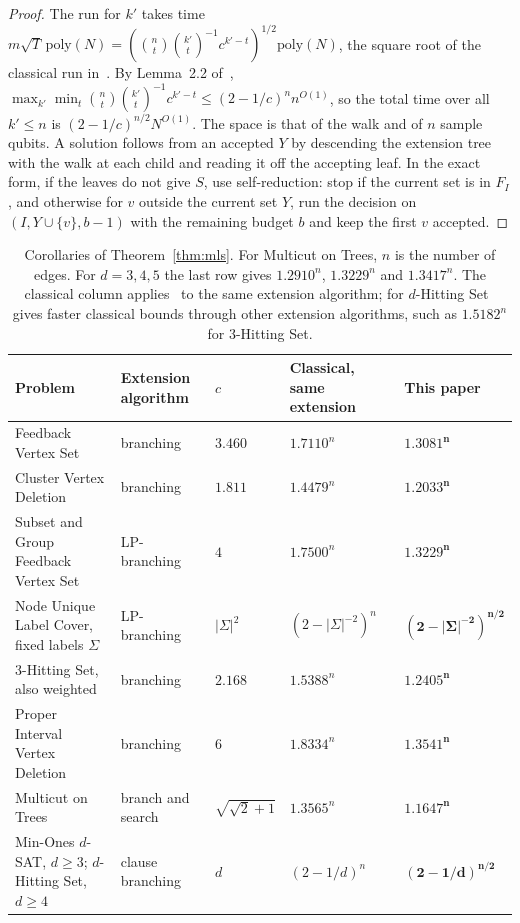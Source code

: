 \documentclass[11pt]{article}
\theoremstyle{remark}
\newcommand{\poly}{\mathrm{poly}}
\begin{document}
\begin{proof}
The run for $k'$ takes time $m\sqrt{T}\,\poly(N) = (\binom{n}{t}\binom{k'}{t}^{-1} c^{k'-t})^{1/2}\poly(N)$, the square root of the classical run in~\cite{FGLS19}. By Lemma~2.2 of~\cite{FGLS19}, $\max_{k'}\min_t \binom{n}{t}\binom{k'}{t}^{-1}c^{k'-t} \le (2-1/c)^n n^{O(1)}$, so the total time over all $k' \le n$ is $(2-1/c)^{n/2}N^{O(1)}$. The space is that of the walk and of $n$ sample qubits. A solution follows from an accepted $Y$ by descending the extension tree with the walk at each child and reading it off the accepting leaf. In the exact form, if the leaves do not give $S$, use self-reduction: stop if the current set is in $F_I$, and otherwise for $v$ outside the current set $Y$, run the decision on $(I, Y \cup \{v\}, b - 1)$ with the remaining budget $b$ and keep the first $v$ accepted.
\end{proof}

\begin{table}[h]
\centering
\small
\renewcommand{\arraystretch}{1.2}
\begin{tabular}{@{}p{3.6cm}p{3.4cm}lll@{}}
\toprule
Problem & Extension algorithm & $c$ & Classical, same extension & This paper\\
\midrule
Feedback Vertex Set & branching~\cite{IK19} & $3.460$ & $1.7110^n$ & $\mathbf{1.3081^n}$\\
Cluster Vertex Deletion & branching~\cite{Tsu19} & $1.811$ & $1.4479^n$ & $\mathbf{1.2033^n}$\\
Subset and Group Feedback Vertex Set & LP-branching~\cite{IWY16} & $4$ & $1.7500^n$ & $\mathbf{1.3229^n}$\\
Node Unique Label Cover, fixed labels $\Sigma$ & LP-branching~\cite{IWY16} & $|\Sigma|^2$ & $(2-|\Sigma|^{-2})^n$ & $\mathbf{(2-|\Sigma|^{-2})^{n/2}}$\\
3-Hitting Set, also weighted & branching~\cite{SZ15} & $2.168$ & $1.5388^n$ & $\mathbf{1.2405^n}$\\
Proper Interval Vertex Deletion & branching~\cite{Cao15} & $6$ & $1.8334^n$ & $\mathbf{1.3541^n}$\\
Multicut on Trees & branch and search~\cite{KLL13} & $\sqrt{\sqrt2+1}$ & $1.3565^n$ & $\mathbf{1.1647^n}$\\
Min-Ones $d$-SAT, $d \ge 3$; $d$-Hitting Set, $d \ge 4$ & clause branching~\cite{FGLS19} & $d$ & $(2-1/d)^n$ & $\mathbf{(2-1/d)^{n/2}}$\\
\bottomrule
\end{tabular}
\caption{Corollaries of Theorem~\ref{thm:mls}. For Multicut on Trees, $n$ is the number of edges. For $d = 3, 4, 5$ the last row gives $1.2910^n$, $1.3229^n$ and $1.3417^n$. The classical column applies~\cite{FGLS19} to the same extension algorithm; for $d$-Hitting Set~\cite{FGLS19} gives faster classical bounds through other extension algorithms, such as $1.5182^n$ for 3-Hitting Set.}
\label{tab:mls}
\end{table}
\end{document}
